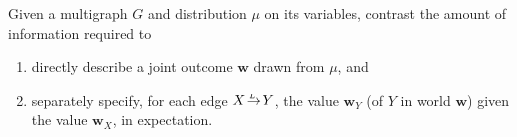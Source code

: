 \documentclass[letterpaper]{article} %
\theoremstyle{plain}
\theoremstyle{definition}
\theoremstyle{remark}
\newcommand\mat[1]{\mathbf{#1}}
\newcommand{\ed}[3]{#2\!%
  \overset{\smash{\mskip-5mu\raisebox{-1pt}{$\scriptscriptstyle
        #1$}}}{\rightarrow}\! #3}
\begin{document}
Given a multigraph $G$ and distribution $\mu$ on its variables,
contrast the amount of
information required to 
\begin{enumerate}[label=(\alph*)]
\item directly describe a joint outcome  \label{item:globalinfo}
$\mat w$ drawn from $\mu$, and 
\item separately specify, for each edge $\ed LXY$, the value
    $\mat w_Y$ (of $Y$ in world $\mat w$) 
	given the value $\mat w_X$, in expectation.
	\label{item:localinfo}
\end{enumerate}
\end{document}
